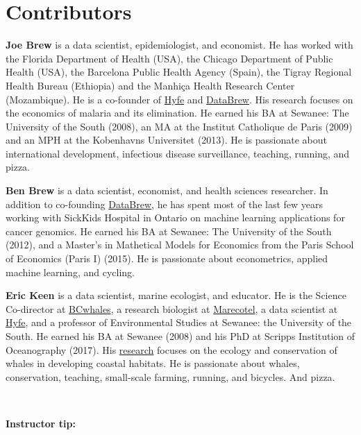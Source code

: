 \documentclass[
]{book}
\begin{document}
\hypertarget{contributors}{%
\section*{Contributors}\label{contributors}}

\textbf{Joe Brew} is a data scientist, epidemiologist, and economist. He has worked with the Florida Department of Health (USA), the Chicago Department of Public Health (USA), the Barcelona Public Health Agency (Spain), the Tigray Regional Health Bureau (Ethiopia) and the Manhiça Health Research Center (Mozambique). He is a co-founder of \href{www.hyfe.ai}{Hyfe} and \href{www.databrew.cc}{DataBrew}. His research focuses on the economics of malaria and its elimination. He earned his BA at Sewanee: The University of the South (2008), an MA at the Institut Catholique de Paris (2009) and an MPH at the Kobenhavns Universitet (2013). He is passionate about international development, infectious disease surveillance, teaching, running, and pizza.

\textbf{Ben Brew} is a data scientist, economist, and health sciences researcher. In addition to co-founding \href{www.databrew.cc}{DataBrew}, he has spent most of the last few years working with SickKids Hospital in Ontario on machine learning applications for cancer genomics. He earned his BA at Sewanee: The University of the South (2012), and a Master's in Mathetical Models for Economics from the Paris School of Economics (Paris I) (2015). He is passionate about econometrics, applied machine learning, and cycling.

\textbf{Eric Keen} is a data scientist, marine ecologist, and educator. He is the Science Co-director at \href{www.bcwhales.org}{BCwhales}, a research biologist at \href{www.marecotel.org}{Marecotel}, a data scientist at \href{www.hyfe.ai}{Hyfe}, and a professor of Environmental Studies at Sewanee: the University of the South. He earned his BA at Sewanee (2008) and his PhD at Scripps Institution of Oceanography (2017). His \href{https://scholar.google.com/citations?hl=en\&user=SrLDYrEAAAAJ\&view_op=list_works\&sortby=pubdate}{research} focuses on the ecology and conservation of whales in developing coastal habitats. He is passionate about whales, conservation, teaching, small-scale farming, running, and bicycles. And pizza.

~

\leavevmode\hypertarget{tip-text}{}%
\textbf{Instructor tip:}
\end{document}
